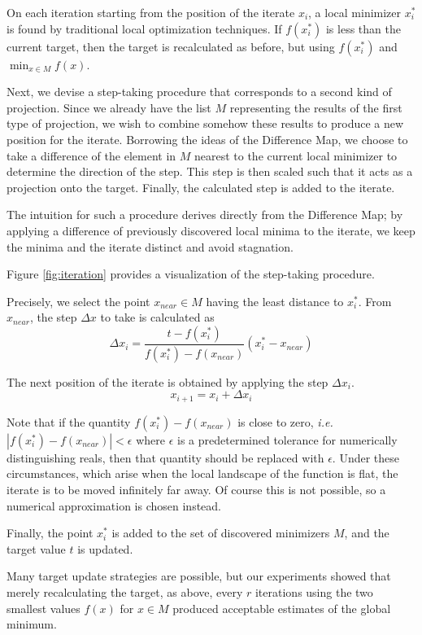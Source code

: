 \documentclass[12pt]{article}
\begin{document}
On each iteration starting from the position of the iterate $x_i$, a local
minimizer $x_i^*$ is found by traditional local optimization techniques.
If $f(x_i^*)$ is less than the current target, then the target is
recalculated as before, but using $f(x_i^*)$ and $\min_{x \in M} f(x)$.

Next, we devise a step-taking procedure that corresponds to a second kind
of projection. Since we already have the list $M$ representing the results of
the first type of projection, we wish to combine somehow these results to
produce a new position for the iterate. Borrowing the ideas of the Difference
Map, we choose to take a difference of the element in $M$ nearest to the
current local minimizer to determine the direction of the step. This step is
then scaled such that it acts as a projection onto the target. Finally, the
calculated step is added to the iterate.

The intuition for such a procedure derives directly from the Difference Map;
by applying a difference of previously discovered local minima to the iterate,
we keep the minima and the iterate distinct and avoid stagnation.

Figure \ref{fig:iteration} provides a visualization of the step-taking
procedure.

Precisely, we select the point $x_{near} \in M$ having the least distance to
$x_i^*$.
From $x_{near}$, the step $\Delta x$ to take is calculated as
\begin{equation*}
    \Delta x_i =
        \frac{t - f(x_i^*)}{f(x_i^*) - f(x_{near})} (x_i^* - x_{near})
    \label{eqn:dx}
\end{equation*}

The next position of the iterate is obtained by applying the step
$\Delta x_i$.
$$
    x_{i+1} = x_i + \Delta x_i
$$

Note that if the quantity $f(x_i^*) - f(x_{near})$ is close to zero,
\emph{i.e.} $|f(x_i^*) - f(x_{near})| < \epsilon$ where $\epsilon$ is a
predetermined tolerance for numerically distinguishing reals, then that
quantity should be replaced with $\epsilon$.  Under these circumstances,
which arise when the local landscape of the function is flat, the iterate is
to be moved infinitely far away.  Of course this is not possible, so a
numerical approximation is chosen instead.

Finally, the point $x_i^*$ is added to the set of discovered minimizers
$M$, and the target value $t$ is updated.

Many target update strategies are possible, but our experiments showed that
merely recalculating the target, as above, every $r$ iterations using the two
smallest values $f(x)$ for $x \in M$ produced acceptable estimates of the
global minimum.
\end{document}
